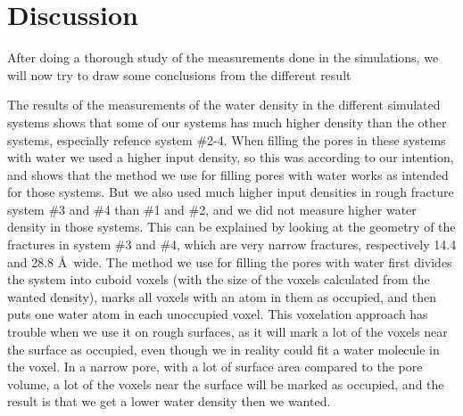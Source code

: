 \chapter{Discussion}
After doing a thorough study of the measurements done in the simulations, we will now try to draw some conclusions from the different result


The results of the measurements of the water density in the different simulated systems shows that some of our systems has much higher density than the other systems, especially refence system \#2-4. When filling the pores in these systems with water we used a higher input density, so this was according to our intention, and shows that the method we use for filling pores with water works as intended for those systems. But we also used much higher input densities in rough fracture system \#3 and \#4 than \#1 and \#2, and we did not measure higher water density in those systems. This can be explained by looking at the geometry of the fractures in system \#3 and \#4, which are very narrow fractures, respectively 14.4 and 28.8 \AA\ wide. The method we use for filling the pores with water first divides the system into cuboid voxels (with the size of the voxels calculated from the wanted density), marks all voxels with an atom in them as occupied, and then puts one water atom in each unoccupied voxel. This voxelation approach has trouble when we use it on rough surfaces, as it will mark a lot of the voxels near the surface as occupied, even though we in reality could fit a water molecule in the voxel. In a narrow pore, with a lot of surface area compared to the pore volume, a lot of the voxels near the surface will be marked as occupied, and the result is that we get a lower water density then we wanted.

